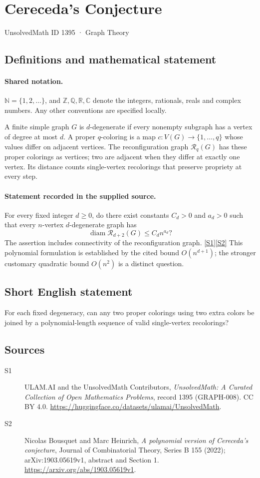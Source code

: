 \documentclass[11pt]{article}
\newcommand{\sref}[2]{\hyperlink{source:#1:#2}{[S#2]}}
\begin{document}
\setcounter{section}{1394}
\section{Cereceda's Conjecture}\label{1395}
{\small\sffamily UnsolvedMath ID 1395 · Graph Theory}
\subsection{Definitions and mathematical statement}

\paragraph{Shared notation.}$\mathbb N=\{1,2,\ldots\}$, and $\mathbb Z,\mathbb Q,\mathbb R,\mathbb C$ denote the integers, rationals, reals and complex numbers. Any other conventions are specified locally.


A finite simple graph $G$ is $d$-degenerate if every nonempty subgraph has a vertex of degree at most $d$. A proper $q$-coloring is a map $c:V(G)\to\{1,\ldots,q\}$ whose values differ on adjacent vertices. The reconfiguration graph $\mathcal R_q(G)$ has these proper colorings as vertices; two are adjacent when they differ at exactly one vertex. Its distance counts single-vertex recolorings that preserve propriety at every step.
\paragraph{Statement recorded in the supplied source.}
For every fixed integer $d\ge0$, do there exist constants $C_d>0$ and $a_d>0$ such that every $n$-vertex $d$-degenerate graph has
\[
 \operatorname{diam}\mathcal R_{d+2}(G)\le C_d n^{a_d}?
\]
The assertion includes connectivity of the reconfiguration graph. \sref{1395}{1}\sref{1395}{2}
This polynomial formulation is established by the cited bound $O(n^{d+1})$; the stronger customary quadratic bound $O(n^2)$ is a distinct question.
\subsection{Short English statement}
For each fixed degeneracy, can any two proper colorings using two extra colors be joined by a polynomial-length sequence of valid single-vertex recolorings?
\subsection{Sources}
\begin{description}
\item[\hypertarget{source:1395:1}{S1}] ULAM.AI and the UnsolvedMath Contributors, \emph{UnsolvedMath: A Curated Collection of Open Mathematics Problems}, record 1395 (GRAPH-008). CC BY 4.0. \url{https://huggingface.co/datasets/ulamai/UnsolvedMath}.
\item[\hypertarget{source:1395:2}{S2}] Nicolas Bousquet and Marc Heinrich, \emph{A polynomial version of Cereceda's conjecture}, Journal of Combinatorial Theory, Series B 155 (2022); arXiv:1903.05619v1, abstract and Section 1. \url{https://arxiv.org/abs/1903.05619v1}.
\end{description}
\label{end:1395}
\end{document}
